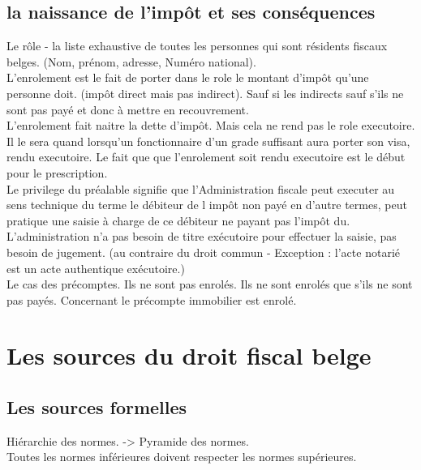\documentclass{book}
\begin{document}
\section{la naissance de l'impôt et ses conséquences}

Le rôle - la liste exhaustive de toutes les personnes qui sont résidents fiscaux belges. (Nom, prénom, adresse, Numéro national).\\

L'enrolement est le fait de porter dans le role le montant d'impôt qu'une personne doit. (impôt direct mais pas indirect). Sauf si les indirects sauf s'ils ne sont pas payé et donc à mettre en recouvrement.\\

L'enrolement fait naitre la dette d'impôt. Mais cela ne rend pas le role executoire. Il le sera quand lorsqu'un fonctionnaire d'un grade suffisant aura porter son visa, rendu executoire. Le fait que que l'enrolement soit rendu executoire est le début pour le prescription. \\

Le privilege du préalable signifie que l'Administration fiscale peut executer au sens technique du terme le débiteur de l impôt non payé en d'autre termes, peut pratique une saisie à charge de ce débiteur ne payant pas l'impôt du. L'administration n'a pas besoin de titre exécutoire pour effectuer la saisie, pas besoin de jugement. (au contraire du droit commun - Exception : l'acte notarié est un acte authentique exécutoire.)\\

Le cas des précomptes. Ils ne sont pas enrolés. Ils ne sont enrolés que s'ils ne sont pas payés. Concernant le précompte immobilier est enrolé.\\

\chapter{Les sources du droit fiscal belge}

\section{Les sources formelles}

Hiérarchie des normes. -> Pyramide des normes.\\

Toutes les normes inférieures doivent respecter les normes supérieures.\\
\end{document}
